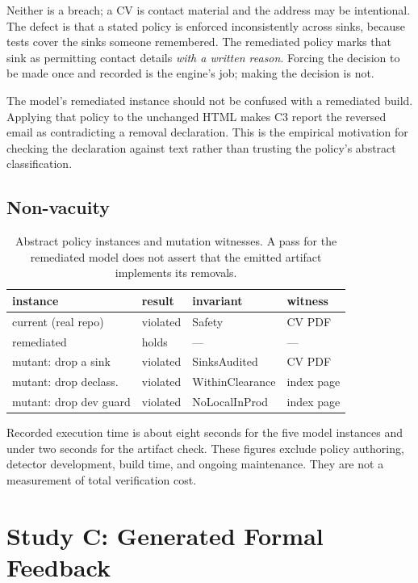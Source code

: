 \documentclass[acmsmall,screen,review,anonymous,nonacm]{acmart}
\begin{document}
Neither is a breach; a CV is contact material and the address may be intentional. The defect is that a stated policy is enforced inconsistently across sinks, because tests cover the sinks someone remembered. The remediated policy marks that sink as permitting contact details \emph{with a written reason}. Forcing the decision to be made once and recorded is the engine's job; making the decision is not.

The model's remediated instance should not be confused with a remediated build. Applying that policy to the unchanged HTML makes C3 report the reversed email as contradicting a removal declaration. This is the empirical motivation for checking the declaration against text rather than trusting the policy's abstract classification.

\subsection{Non-vacuity}
\begin{table}[t]
\centering\footnotesize
\setlength{\tabcolsep}{4pt}
\caption{Abstract policy instances and mutation witnesses. A pass for the remediated model does not assert that the emitted artifact implements its removals.}
\label{tab:studyB}
\begin{tabular}{llll}
\toprule
instance & result & invariant & witness \\
\midrule
current (real repo) & violated & Safety & CV PDF \\
remediated & holds & --- & --- \\
mutant: drop a sink & violated & SinksAudited & CV PDF \\
mutant: drop declass. & violated & WithinClearance & index page \\
mutant: drop dev guard & violated & NoLocalInProd & index page \\
\bottomrule
\end{tabular}
\end{table}

Recorded execution time is about eight seconds for the five model instances and under two seconds for the artifact check. These figures exclude policy authoring, detector development, build time, and ongoing maintenance. They are not a measurement of total verification cost.

\section{Study C: Generated Formal Feedback}
\end{document}

